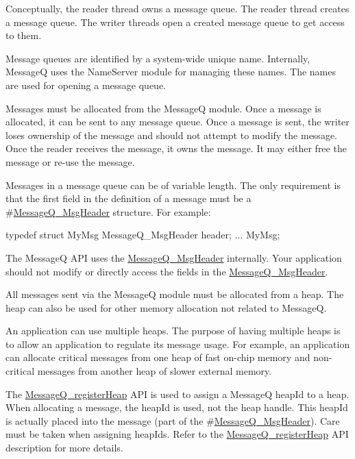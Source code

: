 Conceptually, the reader thread owns a message queue. The reader thread creates a message queue. The writer threads open a created message queue to get access to them.

Message queues are identified by a system-\/wide unique name. Internally, MessageQ uses the NameServer module for managing these names. The names are used for opening a message queue.

Messages must be allocated from the MessageQ module. Once a message is allocated, it can be sent to any message queue. Once a message is sent, the writer loses ownership of the message and should not attempt to modify the message. Once the reader receives the message, it owns the message. It may either free the message or re-\/use the message.

Messages in a message queue can be of variable length. The only requirement is that the first field in the definition of a message must be a \#\hyperlink{struct_message_q___msg_header}{MessageQ\_\-MsgHeader} structure. For example: 
\begin{DoxyCode}
  typedef struct MyMsg {
      MessageQ_MsgHeader header;
      ...
  } MyMsg;
\end{DoxyCode}


The MessageQ API uses the \hyperlink{struct_message_q___msg_header}{MessageQ\_\-MsgHeader} internally. Your application should not modify or directly access the fields in the \hyperlink{struct_message_q___msg_header}{MessageQ\_\-MsgHeader}.

All messages sent via the MessageQ module must be allocated from a heap. The heap can also be used for other memory allocation not related to MessageQ.

An application can use multiple heaps. The purpose of having multiple heaps is to allow an application to regulate its message usage. For example, an application can allocate critical messages from one heap of fast on-\/chip memory and non-\/critical messages from another heap of slower external memory.

The \hyperlink{_message_q_8h_ab74ba85e9c7ebbb1a888df871fd2a6c6}{MessageQ\_\-registerHeap} API is used to assign a MessageQ heapId to a heap. When allocating a message, the heapId is used, not the heap handle. This heapId is actually placed into the message (part of the \#\hyperlink{struct_message_q___msg_header}{MessageQ\_\-MsgHeader}). Care must be taken when assigning heapIds. Refer to the \hyperlink{_message_q_8h_ab74ba85e9c7ebbb1a888df871fd2a6c6}{MessageQ\_\-registerHeap} API description for more details.


